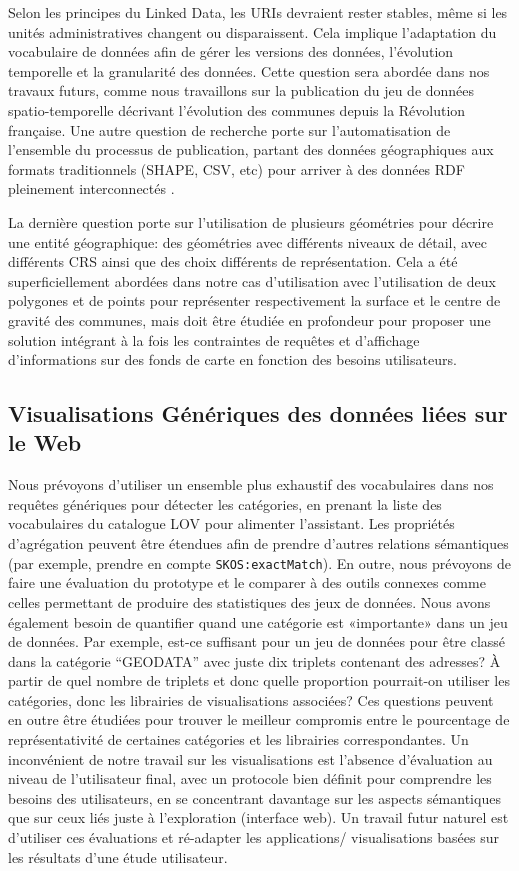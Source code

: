 \documentclass[a4paper,11pt,twoside]{report}
\begin{document}
Selon les principes du Linked Data, les URIs devraient rester stables, même si les unités administratives changent ou disparaissent. Cela implique l'adaptation du vocabulaire de données afin de gérer les versions des données, l'évolution temporelle et la granularité des données. Cette question sera abordée dans nos travaux futurs, comme nous travaillons sur la publication du jeu de données spatio-temporelle décrivant l'évolution des communes depuis la Révolution française. Une autre question de recherche porte sur l'automatisation de l'ensemble du processus de publication, partant des données géographiques aux formats traditionnels (SHAPE, CSV, etc) pour arriver à des données RDF pleinement interconnectés .

La dernière question porte sur l'utilisation de plusieurs géométries pour décrire une entité géographique: des géométries avec différents niveaux de détail, avec différents CRS ainsi que des choix différents de représentation. Cela a été superficiellement abordées dans notre cas d'utilisation avec l'utilisation de deux polygones et de points pour représenter respectivement la surface et le centre de gravité des communes, mais doit être étudiée en profondeur pour proposer une solution intégrant à la fois les contraintes de requêtes et d'affichage d'informations sur des fonds de carte en fonction des besoins utilisateurs.



\subsection*{ Visualisations Génériques des données liées sur le Web}


Nous prévoyons d'utiliser un ensemble plus exhaustif des vocabulaires dans nos requêtes génériques pour détecter les catégories, en prenant la liste des vocabulaires du catalogue LOV pour alimenter l'assistant. Les propriétés d'agrégation peuvent être étendues afin de prendre d'autres relations sémantiques (par exemple, prendre en compte \texttt{SKOS:exactMatch}). En outre, nous prévoyons de faire une évaluation du prototype et le comparer à des outils connexes comme celles permettant de produire des statistiques des jeux de données. Nous avons également besoin de quantifier quand une catégorie est «importante» dans un jeu de données. Par exemple, est-ce suffisant pour un jeu de données pour être classé dans la catégorie ``GEODATA'' avec juste dix triplets contenant des adresses? À partir de quel nombre de triplets et donc quelle proportion pourrait-on utiliser les catégories, donc les librairies de visualisations associées? Ces questions peuvent en outre être étudiées pour trouver le meilleur compromis entre le pourcentage de représentativité de certaines catégories et les librairies correspondantes. Un  inconvénient de notre travail sur les visualisations est l'absence d'évaluation au niveau de l'utilisateur final, avec un protocole bien définit pour comprendre les besoins des utilisateurs, en se concentrant davantage sur les aspects sémantiques que sur ceux liés juste à l'exploration (interface web). Un travail futur naturel est d'utiliser ces évaluations et ré-adapter les applications/ visualisations basées sur les résultats d'une étude utilisateur.
\end{document}
